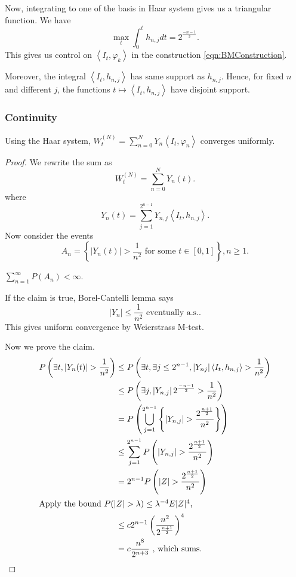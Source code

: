 Now, integrating to one of the basis in Haar system gives us a triangular function. We have
\[
	\max_t \int_0^t h_{n, j} dt = 2^{\frac{- n - 1}{2}}
.\] 
This gives us control on $\left\langle I_t, \varphi_k \right\rangle $ in the construction \eqref{eqn:BMConstruction}.  

Moreover, the integral $\left\langle I_t, h_{n, j} \right\rangle $ has same support as $h_{n,j}$. Hence, for fixed $n$ and different $j$, the functions $t \mapsto \left\langle I_t, h_{n, j} \right\rangle $ have disjoint support.

 \subsubsection{Continuity}

\begin{theorem}
	Using the Haar system,
	$W_t^{(N)} = \sum_{n=0}^{N} Y_n \left\langle I_t, \varphi_n \right\rangle $ converges uniformly.
\end{theorem}
\begin{proof}
	We rewrite the sum as
	\[
		W_t^{(N)} = \sum_{n=0}^{N} Y_n(t)
	.\] 
	where
	\[
		Y_n(t) = \sum_{j=1}^{2^{n-1}} Y_{n, j} \left\langle I_t, h_{n, j} \right\rangle 
	.\] 
	Now consider the events
	\[
		A_n = \left\{|Y_n(t)| > \frac{1}{n^2} \text{ for some } t \in [0,1]\right\} , n\ge 1
	.\] 
	\begin{claim}
	$\sum_{n=1}^{\infty} P(A_n) < \infty $.
	\end{claim}
	If the claim is true, Borel-Cantelli lemma says
	\[
		|Y_n| \le  \frac{1}{n^2} \text{ eventually a.s.}
	.\] 
	This gives uniform convergence by Weierstrass M-test.

	Now we prove the claim. 
	\begin{align*}
		P\left( \exists t, |Y_n(t)| > \frac{1}{n^2} \right) 
		&\leq P\left( \exists t, \exists j \le 2^{n-1},|Y_{n j}| \left\langle I_t, h_{n,j} \right\rangle > \frac{1}{n^2} \right)  \\
		&\leq P\left( \exists j,  \left| Y_{n, j} \right| 2^{\frac{- n - 1}{2}}> \frac{1}{n^2} \right)  \\
		&= P\left( \bigcup_{j = 1} ^{2^{n-1}} \left\{|Y_{n,j}| > \frac{2^{\frac{n +1}{2}}}{n^2}\right\}  \right)  \\
		&\leq \sum_{j = 1} ^{2^{n-1}} P\left( |Y_{n,j}| > \frac{2^{\frac{n +1}{2}}}{n^2}  \right)  \\
		&= 2^{n-1} P\left( |Z| >\frac{2^{\frac{n +1}{2}}}{n^2}  \right)  \\
		\intertext{Apply the bound $P(|Z| > \lambda) \le \lambda^{-4} E|Z|^4$,}
		&\leq c 2^{n-1} \left( \frac{n^2}{2^{\frac{n+1}{2}}} \right)^4  \\
		&= c \frac{n^8}{2^{n+3}} \text{ , which sums}
	.\end{align*}
\end{proof}


